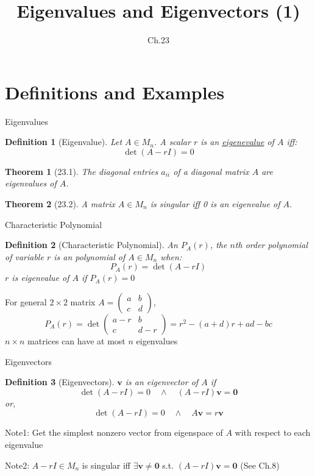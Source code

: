 \documentclass[final]{beamer}
\author[조남운]{\mail}
\title{Eigenvalues and Eigenvectors (1)}
\subtitle{Ch.23}
\newtheorem{defn}{Definition}
\newtheorem{thm}{Theorem}
\newcommand{\bd}{\mathbf}
\begin{document}
	
\maketitle


\section{Definitions and Examples} %
\label{sec:definitions_and_examples}
\begin{frame}[t]{Eigenvalues}
	\begin{defn}
		[Eigenvalue] Let $A\in M_n$. A scalar $r$ is an \uline{eigenevalue} of $A$ iff:
		\[
			\det(A-rI)=0
		\]
	\end{defn}
	\begin{thm}
		[23.1] The diagonal entries $a_{ii}$ of a diagonal matrix $A$ are eigenvalues of $A$.
	\end{thm}
	\begin{thm}
		[23.2] A matrix $A\in M_n$ is singular iff 0 is an eigenvalue of $A$. 
	\end{thm}
\end{frame}

\begin{frame}[t]{Characteristic Polynomial}
	\begin{defn}
		[Characteristic Polynomial] An $P_A(r)$, the $n$th order polynomial of variable $r$ is an polynomial of $A\in M_n$ when:\[
			P_A(r)=\det(A-rI) 
		\]
		$r$ is eigenvalue of $A$ if $P_A(r)=0$
	\end{defn}
	For general $2\times 2$ matrix $A = \begin{pmatrix}
		a & b\\c&d
	\end{pmatrix}$, 
	\[
		P_A(r) = \det \begin{pmatrix}
			a-r & b \\
			c & d-r
		\end{pmatrix} = r^2 - (a+d)r+ad-bc
	\]
	$n\times n$ matrices can have at most $n$ eigenvalues
\end{frame}
\begin{frame}[t]{Eigenvectors}
	\begin{defn}
		[Eigenvectors] $\bd{v}$ is an eigenvector of $A$ if \[
			\det(A-rI)=0 \quad \land \quad (A-rI)\bd{v}=\bd{0}
		\]or, \[
			\det(A-rI)=0 \quad \land \quad A\bd{v} = r\bd{v}
		\]
	\end{defn}
	Note1: Get the simplest nonzero vector from eigenspace of $A$ with respect to each eigenvalue
	 
	Note2: $A-rI\in M_n$ is singular iff $\exists \bd{v}\neq \bd{0}$  s.t. $(A-rI)\bd{v}=\bd{0}$ (See Ch.8)
\end{frame}
\end{document}
